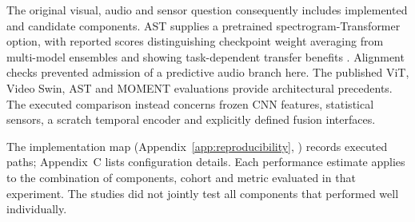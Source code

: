 The original visual, audio and sensor question consequently includes implemented and candidate components. AST supplies a pretrained spectrogram-Transformer option, with reported scores distinguishing checkpoint weight averaging from multi-model ensembles and showing task-dependent transfer benefits \citep{P011}. Alignment checks prevented admission of a predictive audio branch here. The published ViT, Video Swin, AST and MOMENT evaluations provide architectural precedents. The executed comparison instead concerns frozen CNN features, statistical sensors, a scratch temporal encoder and explicitly defined fusion interfaces.

The implementation map (Appendix~\ref{app:reproducibility}, ) records executed paths; Appendix~C lists configuration details. Each performance estimate applies to the combination of components, cohort and metric evaluated in that experiment. The studies did not jointly test all components that performed well individually.
